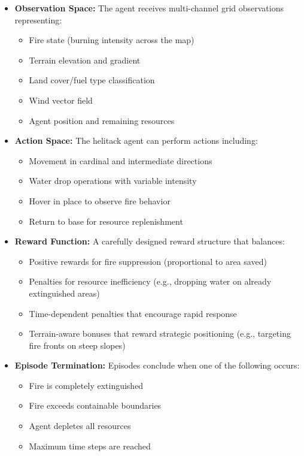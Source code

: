 \documentclass[conference]{IEEEtran}
\begin{document}
\begin{itemize}
    \item \textbf{Observation Space:} The agent receives multi-channel grid observations representing:
    \begin{itemize}
        \item Fire state (burning intensity across the map)
        \item Terrain elevation and gradient
        \item Land cover/fuel type classification
        \item Wind vector field
        \item Agent position and remaining resources
    \end{itemize}
    
    \item \textbf{Action Space:} The helitack agent can perform actions including:
    \begin{itemize}
        \item Movement in cardinal and intermediate directions
        \item Water drop operations with variable intensity
        \item Hover in place to observe fire behavior
        \item Return to base for resource replenishment
    \end{itemize}
    
    \item \textbf{Reward Function:} A carefully designed reward structure that balances:
    \begin{itemize}
        \item Positive rewards for fire suppression (proportional to area saved)
        \item Penalties for resource inefficiency (e.g., dropping water on already extinguished areas)
        \item Time-dependent penalties that encourage rapid response
        \item Terrain-aware bonuses that reward strategic positioning (e.g., targeting fire fronts on steep slopes)
    \end{itemize}
    
    \item \textbf{Episode Termination:} Episodes conclude when one of the following occurs:
    \begin{itemize}
        \item Fire is completely extinguished
        \item Fire exceeds containable boundaries
        \item Agent depletes all resources
        \item Maximum time steps are reached
    \end{itemize}
\end{itemize}
\end{document}
